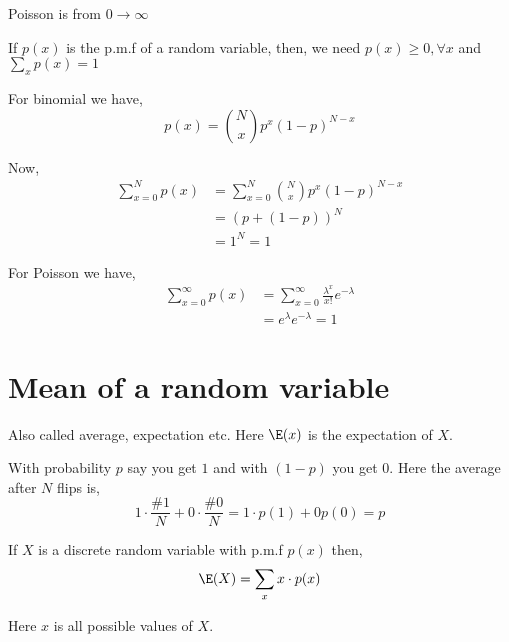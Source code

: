 \begin{note}
    Poisson is from $0 \to \infty$
\end{note}
\vspace{1em}
\hline 
\vspace{1em}

If $p(x)$ is the p.m.f of a random variable, then, we need $p(x) \ge 0, \forall x$ and  $\sum_{x} p(x) = 1$


\begin{eg}
    For binomial we have, 
    $$ p(x) = {N \choose x} p^{x} (1 - p)^{N - x} $$ 

    Now, 
    \begin{align*}
        \sum_{x = 0}^{N} p(x) &= \sum_{x = 0}^{N} {N \choose x} p^{x} (1 - p)^{N - x} \\
                              &= (p + (1 - p))^{N} \\
                              &= 1^{N} = 1
    \end{align*}
\end{eg}

\begin{eg}
    For Poisson we have, 
    \begin{align*}
        \sum_{x = 0}^{\infty} p(x) &= \sum_{x=0}^{\infty} \frac{\lambda^{x}}{x!} e^{-\lambda}\\
                                   &= e^{\lambda}e^{-\lambda} = 1
    \end{align*}
\end{eg}


\section{Mean of a random variable}

Also called average, expectation etc. Here $\E(x)$ is the expectation of  $X$.

\begin{eg}
    With probability $p$ say you get $1$ and with $(1 - p)$ you get $0$. Here the average after $N$ flips is, 
    $$ 1 \cdot \frac{\#1}{N} + 0 \cdot \frac{\#0}{N} = 1 \cdot p(1) + 0 p(0) = p  $$ 
\end{eg}

\begin{definition}
    If $X$ is a discrete random variable with p.m.f $p(x)$ then,  
    $$ \E(X) = \sum_{x} x \cdot p(x) $$ 
\end{definition}
\begin{note}
    Here $x$ is all possible values of $X$.
\end{note}


